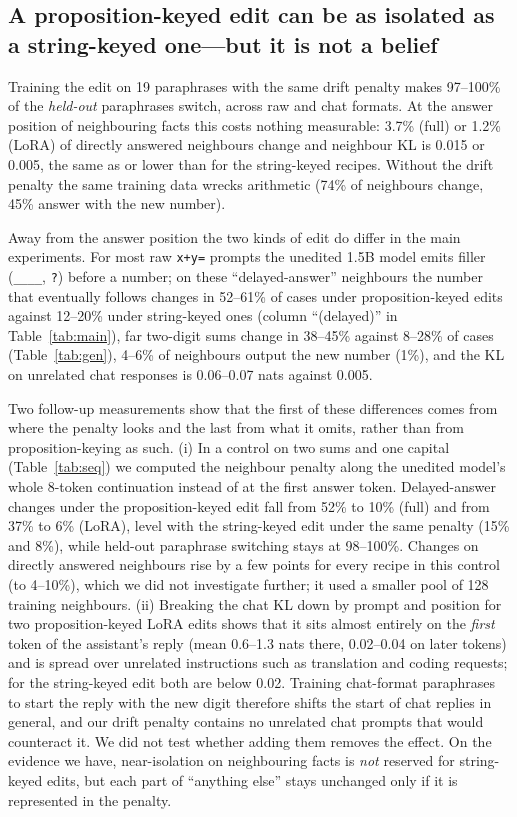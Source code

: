 \subsection{A proposition-keyed edit can be as isolated as a string-keyed one---but it is not a belief}
Training the edit on 19 paraphrases with the same drift penalty makes 97--100\% of the \emph{held-out} paraphrases switch, across raw and chat formats. At the answer position of neighbouring facts this costs nothing measurable: 3.7\% (full) or 1.2\% (LoRA) of directly answered neighbours change and neighbour KL is 0.015 or 0.005, the same as or lower than for the string-keyed recipes. Without the drift penalty the same training data wrecks arithmetic (74\% of neighbours change, 45\% answer with the new number).

Away from the answer position the two kinds of edit do differ in the main experiments. For most raw \texttt{x+y=} prompts the unedited 1.5B model emits filler (\texttt{\_\_\_\_}, \texttt{?}) before a number; on these ``delayed-answer'' neighbours the number that eventually follows changes in 52--61\% of cases under proposition-keyed edits against 12--20\% under string-keyed ones (column ``(delayed)'' in Table~\ref{tab:main}), far two-digit sums change in 38--45\% against 8--28\% of cases (Table~\ref{tab:gen}), 4--6\% of neighbours output the new number (1\%), and the KL on unrelated chat responses is 0.06--0.07 nats against 0.005.

Two follow-up measurements show that the first of these differences comes from where the penalty looks and the last from what it omits, rather than from proposition-keying as such. (i) In a control on two sums and one capital (Table~\ref{tab:seq}) we computed the neighbour penalty along the unedited model's whole 8-token continuation instead of at the first answer token. Delayed-answer changes under the proposition-keyed edit fall from 52\% to 10\% (full) and from 37\% to 6\% (LoRA), level with the string-keyed edit under the same penalty (15\% and 8\%), while held-out paraphrase switching stays at 98--100\%. Changes on directly answered neighbours rise by a few points for every recipe in this control (to 4--10\%), which we did not investigate further; it used a smaller pool of 128 training neighbours. (ii) Breaking the chat KL down by prompt and position for two proposition-keyed LoRA edits shows that it sits almost entirely on the \emph{first} token of the assistant's reply (mean 0.6--1.3 nats there, 0.02--0.04 on later tokens) and is spread over unrelated instructions such as translation and coding requests; for the string-keyed edit both are below 0.02. Training chat-format paraphrases to start the reply with the new digit therefore shifts the start of chat replies in general, and our drift penalty contains no unrelated chat prompts that would counteract it. We did not test whether adding them removes the effect. On the evidence we have, near-isolation on neighbouring facts is \emph{not} reserved for string-keyed edits, but each part of ``anything else'' stays unchanged only if it is represented in the penalty.

